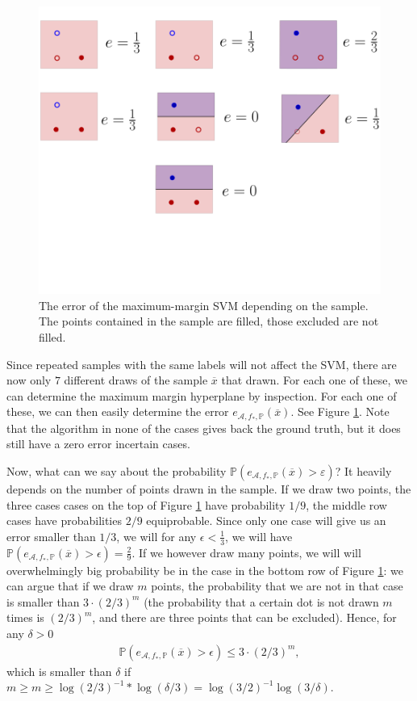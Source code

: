 \documentclass{article}
\newcommand{\calA}{\mathcal{A}}
\begin{document}
\begin{figure} 
    \centering\includegraphics[width=0.5\linewidth]{graphics/error_svm.png}
    \caption{The error of the maximum-margin SVM depending on the sample. The points contained in the sample are filled, those excluded are not filled.}

    \label{fig:errors_svm}
\end{figure}

Since repeated samples with the same labels will not affect the SVM, there are now only $7$ different draws of the sample $\overline{x}$ that  drawn. For each one of these, we can determine the maximum margin hyperplane by inspection. For each one of these, we can then easily determine the error $e_{\calA,f_*,\mathbb{P}}(\overline{x})$. See Figure \ref{fig:errors_svm}. Note that the algorithm in none of the cases gives back the ground truth, but it does still have a zero error incertain cases.

Now, what can we say about the probability $\mathbb{P}(e_{\mathcal{A},f_*,\mathbb{P}}(\overline{x}) > \varepsilon)$? It heavily depends on the number of points drawn in the sample. If we draw two points, the three cases cases on the top of Figure \ref{fig:errors_svm} have probability $1/9$, the middle row cases have probabilities $2/9$ equiprobable. Since only one case will give us an error smaller than $1/3$, we will for any $\epsilon<\frac{1}{3}$, we will have $ \mathbb{P}( e_{\calA,f_*,\mathbb{P}}(\overline{x}) >\epsilon)= \tfrac{2}{9}$. If we however draw many points, we will will overwhelmingly big probability be in the case in the bottom row of Figure \ref{fig:errors_svm}: we can argue that if we draw $m$ points, the probability that we are not in that case is smaller than $3\cdot (2/3)^m$ (the probability that a certain dot is not drawn $m$ times is $(2/3)^m$, and there are three points that can be excluded). Hence, for any $\delta>0$
\begin{align*}
    \mathbb{P}( e_{\calA,f_*,\mathbb{P}}(\overline{x}) >\epsilon)\leq 3\cdot (2/3)^m,
\end{align*}
which is smaller than $\delta$ if $m \geq m \geq \log(2/3)^{-1}*\log(\delta/3)= \log(3/2)^{-1}\log(3/\delta)$.
\end{document}

